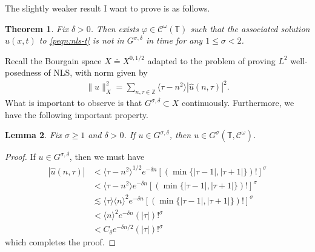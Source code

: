 \documentclass[12pt,reqno]{amsart}
\numberwithin{equation}{section}  %
\newcommand{\zz}{\mathbb{Z}}
\newcommand{\ci}{\mathbb{T}}
\newcommand{\wh}{\widehat}
\newcommand{\vp}{\varphi}
\newtheorem{theorem}{Theorem}[section]
\newtheorem{lemma}[theorem]{Lemma}
\begin{document}
%
%
The slightly weaker result I want to prove
is as follows.
%
\begin{theorem}
  Fix $\delta > 0$. Then exists
  $\vp \in  \mathcal{C}^\omega(\mathbb{T})$ such that the associated solution
  $u(x,t)$ to \eqref{peqn:nls-t} is not in $G^{\sigma, \delta}$
  in time for any $1 \le \sigma < 2$. 
\label{thm:sharp-weak}
\end{theorem}
%
Recall the Bourgain space $X \doteq X^{0,1/2}$ adapted to the problem of proving
$L^{2}$ well-posedness of
NLS, with norm given by
%
\begin{equation*}
\begin{split}
  \| u \|_{X}^{2} = \sum_{n, \tau \in \zz} \langle \tau - n^{2} \rangle 
  | \wh{u}(n, \tau) |^{2}.
\end{split}
\end{equation*}
%
%
What is important to observe is that $G^{\sigma, \delta} \subset X$
continuously. Furthermore, we have the following important property. %
%
%
%
%
%
%
%
\begin{lemma}
  Fix $\sigma \ge 1$ and $\delta > 0$.
  If $u \in G^{\sigma, \delta}$, then $u \in G^{\sigma}(\ci,
  \mathcal{C}^{\omega})$.
\label{lem:main-space-embed}
\end{lemma}
%
%
%
%
\begin{proof}
If $u \in G^{\sigma, \delta}$, then we must have
%
%
\begin{equation*}
\begin{split}
| \wh{u}(n, \tau) |
& <  \langle \tau - n^{2} \rangle^{1/2}    e^{-\delta n}
[(\min \{ |\tau -1 |, |\tau + 1| \})!]^{ \sigma}
\\
& <  \langle \tau - n^{2} \rangle e^{-\delta n}
[(\min \{ |\tau -1 |, |\tau + 1| \})!]^{ \sigma}
\\
& \lesssim \langle \tau \rangle \langle n \rangle ^{2}
e^{-\delta n}
[(\min \{ |\tau -1 |, |\tau + 1| \})!]^{ \sigma}
\\
& < \langle n \rangle ^{2}
e^{-\delta n}
(| \tau |)!^{ \sigma}
\\
& < C_{\delta} e^{-\delta n/2} (| \tau |)!^{\sigma}
\end{split}
\end{equation*}
%
which completes the proof.
%
\end{proof}
%
%
%
%
\end{document}
